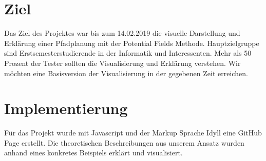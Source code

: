 


\section{Ziel}
Das Ziel des Projektes war bis zum 14.02.2019 die visuelle Darstellung und Erklärung einer Pfadplanung mit der Potential Fields Methode. Hauptzielgruppe sind Erstsemesterstudierende in der Informatik und Interessenten. Mehr als 50 Prozent der Tester sollten die Visualisierung und Erklärung verstehen. Wir möchten eine Basisversion der Visualisierung in der gegebenen Zeit erreichen.
\section{Implementierung}
Für das Projekt wurde mit Javascript und der Markup Sprache Idyll eine GitHub Page \cite{gitpage} erstellt.
Die theoretischen Beschreibungen aus unserem Ansatz wurden anhand eines konkretes Beispiels erklärt und visualisiert. 

